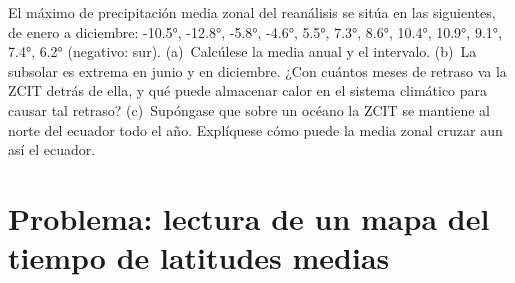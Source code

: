 \begin{exercise}[$\star\star\star$]\label{exo:b1:atmospheric-circulation:12}
El máximo de precipitación media zonal del reanálisis se sitúa en las  siguientes, de enero a diciembre: \ang{-10.5}, \ang{-12.8}, \ang{-5.8}, \ang{-4.6}, \ang{5.5}, \ang{7.3}, \ang{8.6}, \ang{10.4}, \ang{10.9}, \ang{9.1}, \ang{7.4}, \ang{6.2} (negativo: sur). (a)~Calcúlese la media anual y el intervalo. (b)~La  subsolar es extrema en junio y en diciembre. ¿Con cuántos meses de retraso va la ZCIT detrás de ella, y qué puede almacenar calor en el sistema climático para causar tal retraso? (c)~Supóngase que sobre un océano la ZCIT se mantiene al norte del ecuador todo el año. Explíquese cómo puede la media zonal cruzar aun así el ecuador.
\end{exercise}

\section{Problema: lectura de un mapa del tiempo de latitudes medias}

